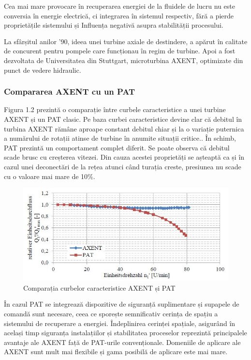 Cea mai mare provocare în recuperarea energiei de la fluidele de lucru nu este conversia în energie electrică, ci integrarea în sistemul respectiv, fără a pierde proprietățile sistemului și
Influența negativă asupra stabilității procesului.

La sfârșitul anilor '90, ideea unei turbine axiale de destindere, a apărut în calitate de concurent pentru pompele care funcționau în regim de turbine. Apoi a fost dezvoltata de Universitatea din Stuttgart, microturbina AXENT, optimizate din punct de vedere hidraulic.


\subsubsection{Compararea AXENT cu un PAT}

Figura 1.2 prezintă o comparație între curbele caracteristice a unei turbine AXENT și un PAT clasic. Pe baza curbei caracteristice devine clar că debitul în turbina AXENT rămâne aproape constant debitul chiar și la o variație puternica a numărului de rotații atinse de turbine în anumite situații critice.. În schimb, PAT prezintă un comportament complet diferit. Se poate observa că debitul scade brusc cu creșterea vitezei. Din cauza acestei proprietăți se așteaptă ca și în cazul unei deconectări de la rețea atunci când turația creste, presiunea nu scade cu o valoare mai mare de 10\%.

\begin{figure}[h!]
	\centering
	\includegraphics[scale=0.7]{figures/axent-pat.jpg}
	\caption{Comparația curbelor caracteristice AXENT și PAT \cite{neipp2017zweistufige}}
	\label{Comparația curbelor caracteristice AXENT și PAT\u{a}}
\end{figure}

În cazul PAT se integrează dispozitive de siguranță suplimentare și supapele de comandă sunt necesare, ceea ce sporește semnificativ cerința de spațiu a sistemului de recuperare a energiei. Îndeplinirea cerinței spațiale, asigurând în același timp siguranța instalațiilor și stabilitatea proceselor reprezintă principalele avantaje ale AXENT față de PAT-urile convenționale. Domeniile de aplicare ale AXENT sunt mult mai flexibile și gama posibilă de aplicare este mai mare.


